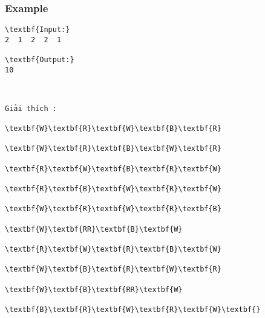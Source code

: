 \subsubsection{   Example  }
\begin{verbatim}
\textbf{Input:}
2  1  2  2  1

\textbf{Output:}
10\end{verbatim}
\begin{verbatim}


Giải thích :

\textbf{W}\textbf{R}\textbf{W}\textbf{B}\textbf{R}

\textbf{W}\textbf{R}\textbf{B}\textbf{W}\textbf{R}

\textbf{R}\textbf{W}\textbf{B}\textbf{R}\textbf{W}

\textbf{R}\textbf{B}\textbf{W}\textbf{R}\textbf{W}

\textbf{W}\textbf{R}\textbf{W}\textbf{R}\textbf{B}

\textbf{W}\textbf{RR}\textbf{B}\textbf{W}

\textbf{R}\textbf{W}\textbf{R}\textbf{B}\textbf{W}

\textbf{W}\textbf{B}\textbf{R}\textbf{W}\textbf{R}

\textbf{W}\textbf{B}\textbf{RR}\textbf{W}

\textbf{B}\textbf{R}\textbf{W}\textbf{R}\textbf{W}\textbf{}\end{verbatim}